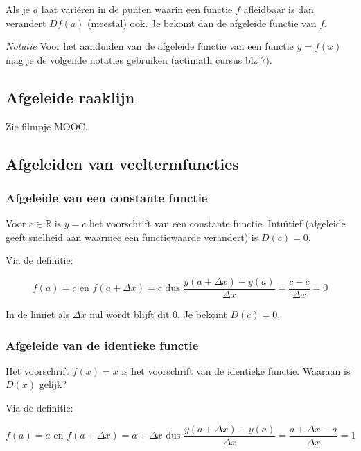 \begin{definitie}
	Als je $a$ laat vari\"eren in de punten waarin een functie $f$ afleidbaar is dan verandert $Df(a)$ (meestal) ook.
	Je bekomt dan de afgeleide functie van $f$.
\end{definitie}

\emph{Notatie}
Voor het aanduiden van de afgeleide functie van een functie $y=f(x)$ mag je de volgende notaties gebruiken (actimath cursus blz 7).

\subsection{Afgeleide raaklijn}

Zie filmpje MOOC.

\subsection{Afgeleiden van veeltermfuncties}

\subsubsection{Afgeleide van een constante functie}

Voor $c\in \mathbb{R}$ is $y=c$ het voorschrift van een constante functie.
Intu\"itief (afgeleide geeft snelheid aan waarmee een functiewaarde verandert) is $D(c)=0$.\vspace{3 mm}

\noindent Via de definitie:

\begin{equation*}
f(a)=c \text{ en } f(a+\Delta x)= c \text{ dus } \frac{y(a+ \Delta x)-y(a)}{\Delta x}=\frac {c-c}{\Delta x}=0
\end{equation*}

\noindent In de limiet als $\Delta x$ nul wordt blijft dit 0.
Je bekomt $D(c)=0$.

\subsubsection{Afgeleide van de identieke functie}

Het voorschrift $f(x)=x$ is het voorschrift van de identieke functie.
Waaraan is $D(x)$ gelijk?\vspace{3mm}

\noindent Via de definitie:

\begin{equation*}
f(a)=a \text{ en } f(a+\Delta x)=a+\Delta x \text{ dus }\frac{y(a+\Delta x)-y(a)}{\Delta x}=\frac{a+\Delta x -a}{\Delta x}=1
\end{equation*}

